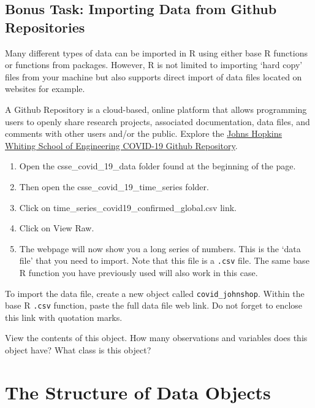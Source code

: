 \documentclass[
]{book}
\providecommand{\tightlist}{%
  \setlength{\itemsep}{0pt}\setlength{\parskip}{0pt}}
\begin{document}
\hypertarget{bonus-task-importing-data-from-github-repositories}{%
\section{Bonus Task: Importing Data from Github Repositories}\label{bonus-task-importing-data-from-github-repositories}}

Many different types of data can be imported in R using either base R functions or functions from packages. However, R is not limited to importing `hard copy' files from your machine but also supports direct import of data files located on websites for example.

A Github Repository is a cloud-based, online platform that allows programming users to openly share research projects, associated documentation, data files, and comments with other users and/or the public.
Explore the \href{(https://github.com/CSSEGISandData/COVID-19)}{Johns Hopkins Whiting School of Engineering COVID-19 Github Repository}.

\begin{enumerate}
\def\labelenumi{\arabic{enumi}.}
\tightlist
\item
  Open the csse\_covid\_19\_data folder found at the beginning of the page.
\item
  Then open the csse\_covid\_19\_time\_series folder.
\item
  Click on time\_series\_covid19\_confirmed\_global.csv link.
\item
  Click on View Raw.
\item
  The webpage will now show you a long series of numbers. This is the `data file' that you need to import. Note that this file is a \texttt{.csv} file. The same base R function you have previously used will also work in this case.
\end{enumerate}

To import the data file, create a new object called \texttt{covid\_johnshop}. Within the base R \texttt{.csv} function, paste the full data file web link. Do not forget to enclose this link with quotation marks.

View the contents of this object. How many observations and variables does this object have? What class is this object?

\hypertarget{the-structure-of-data-objects}{%
\chapter{The Structure of Data Objects}\label{the-structure-of-data-objects}}
\end{document}
